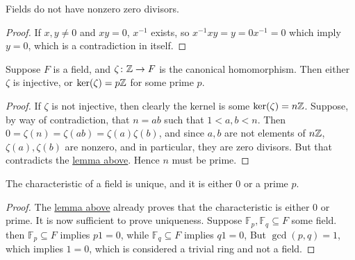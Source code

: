 \begin{lemma}\label{lem:field-no-zero-divisors}
    Fields do not have nonzero zero divisors.
\end{lemma}
\begin{proof}
    If \(x,y \neq 0\) and \(xy = 0\),
    \(x^{-1}\) exists, so \(x^{-1}xy = y = 0x^{-1} = 0\)
    which imply \(y = 0\), which is a contradiction in itself.
\end{proof}
\begin{lemma}\label{lem:field-prime-kernel}
    Suppose \(F\) is a field,
    and \(\zeta\colon\mathbb{Z}\to F\) is the canonical homomorphism.
    Then either \(\zeta\) is injective,
    or \(\ker(\zeta) = p\mathbb{Z}\) for some prime \(p\).
\end{lemma}
\begin{proof}
    If \(\zeta\) is not injective,
    then clearly the kernel is some \(\ker(\zeta) = n\mathbb{Z}\).
    Suppose, by way of contradiction, that \(n = ab\) such that \(1 < a,b < n\).
    Then \(0 = \zeta(n) = \zeta(ab) = \zeta(a)\zeta(b)\),
    and since \(a,b\) are not elements of \(n\mathbb{Z}\),
    \(\zeta(a),\zeta(b)\) are nonzero,
    and in particular, they are zero divisors.
    But that contradicts the \hyperref[lem:field-no-zero-divisors]{lemma above}.
    Hence \(n\) must be prime.
\end{proof}
\begin{theorem}\label{thm:field-unique-prime-char}
    The characteristic of a field is unique,
    and it is either 0 or a prime \(p\).
\end{theorem}
\begin{proof}
    The \hyperref[lem:field-prime-kernel]{lemma above}
    already proves that the characteristic is either 0 or prime.
    It is now sufficient to prove uniqueness.
    Suppose \(\mathbb{F}_p, \mathbb{F}_q \subseteq F\) some field.
    then \(\mathbb{F}_p \subseteq F\) implies \(p1 = 0\),
    while \(\mathbb{F}_q \subseteq F\) implies \(q1 = 0\),
    But \(\gcd(p,q) = 1\), which implies \(1 = 0\),
    which is considered a trivial ring and not a field.
\end{proof}


